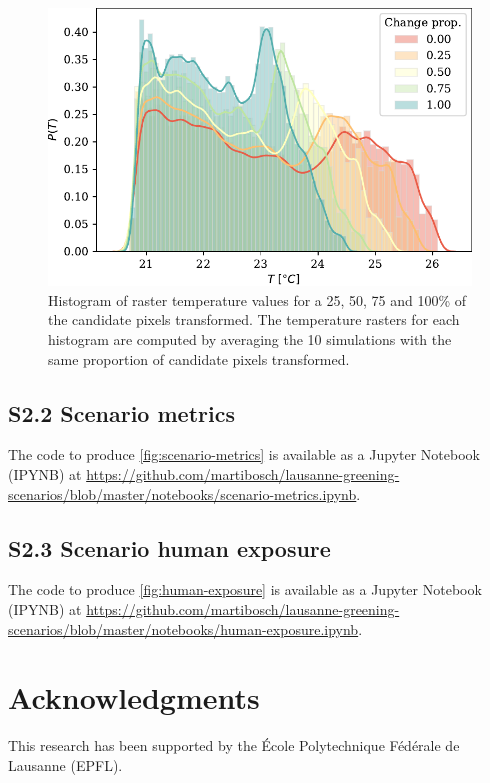 \documentclass[10pt,letterpaper]{article}
\begin{document}
\begin{figure}[H]
  \centering
  \includegraphics[width=.6\textwidth]{figures/scenario-T-hists}
  \caption{\label{fig:si-scenario-T-hists} Histogram of raster temperature values for a 25, 50, 75 and 100\% of the candidate pixels transformed. The temperature rasters for each histogram are computed by averaging the 10 simulations with the same proportion of candidate pixels transformed.}
\end{figure}


\subsection*{S2.2 Scenario metrics}
\label{sec:si-scenario-metrics}

The code to produce \autoref{fig:scenario-metrics} is available as a Jupyter Notebook (IPYNB) at \url{https://github.com/martibosch/lausanne-greening-scenarios/blob/master/notebooks/scenario-metrics.ipynb}.


\subsection*{S2.3 Scenario human exposure}
\label{sec:si-human-exposure}


The code to produce \autoref{fig:human-exposure} is available as a Jupyter Notebook (IPYNB) at \url{https://github.com/martibosch/lausanne-greening-scenarios/blob/master/notebooks/human-exposure.ipynb}.

\section*{Acknowledgments}
This research has been supported by the \'Ecole Polytechnique F\'ed\'erale de Lausanne (EPFL).

\nolinenumbers




\end{document}

